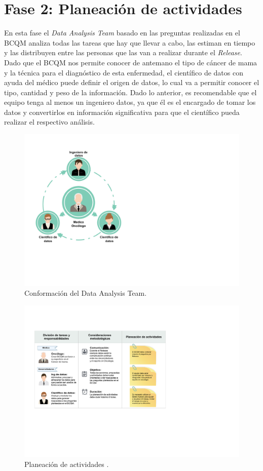 \section{Fase 2: Planeación de actividades}
En esta fase el \textit{Data Analysis Team} basado en las preguntas realizadas en el BCQM analiza todas las tareas que hay que llevar a cabo, las estiman en tiempo y las distribuyen entre las personas que las van a realizar durante el \textit{Release}. Dado que el BCQM nos permite conocer de antemano el tipo de cáncer de mama y la técnica para el diagnóstico de esta enfermedad, el científico de datos con ayuda del médico puede definir el origen de datos, lo cual va a permitir conocer el tipo, cantidad y peso de la información. Dado lo anterior, es recomendable que el equipo tenga al menos un ingeniero datos, ya que él es el encargado de tomar los datos y convertirlos en información significativa para que el científico pueda realizar el respectivo análisis.  

\begin{figure}[!htb]
	\centering
	\includegraphics[width=0.36
	\linewidth]{IMAGENES/Data_Analysis_Team}
	\caption{Conformación del Data Analysis Team\cite{planning023}. }
	\label{Data_Analysis_Team}
\end{figure}

\begin{figure}[!htb]
	\centering
	\includegraphics[width=0.68
	\linewidth]{IMAGENES/Activity_Planning}
	\caption{Planeación de actividades \cite{planning023}. }
	\label{Activity_Planning}
\end{figure}

